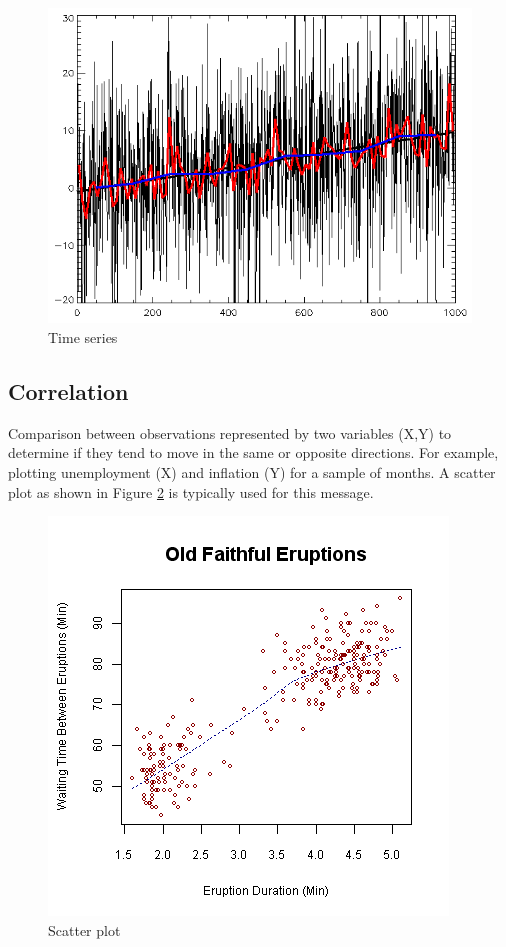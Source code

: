 \documentclass{llncs}
\begin{document}
\begin{figure}[h!]
\centering
\includegraphics[scale=0.3]{time}
\caption{Time series}
\label{fig:time}
\end{figure}

\subsection{Correlation}
Comparison between observations represented by two variables (X,Y) to determine if they tend to move in the same or opposite directions. For example, plotting unemployment (X) and inflation (Y) for a sample of months. A scatter plot as shown in Figure \ref{fig:scatter} is typically used for this message.

\begin{figure}[h!]
\centering
\includegraphics[scale=0.4]{scatter}
\caption{Scatter plot}
\label{fig:scatter}
\end{figure}
\end{document}

